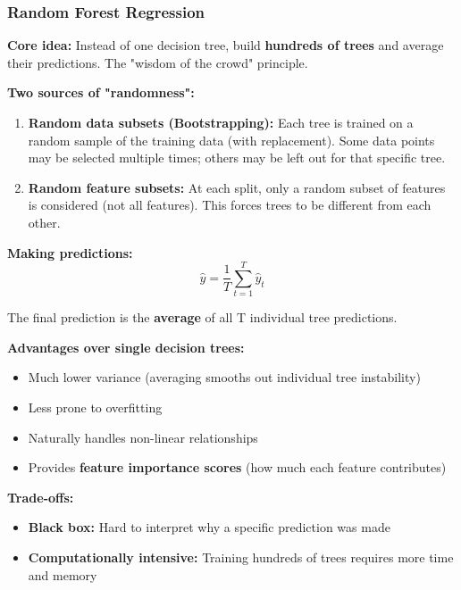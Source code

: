 \documentclass[12pt,openany]{book}
\begin{document}
\medskip


\subsubsection{Random Forest Regression}


\textbf{Core idea:} Instead of one decision tree, build \textbf{hundreds of trees} and average their predictions. The "wisdom of the crowd" principle.

\textbf{Two sources of "randomness":}

\begin{enumerate}[leftmargin=*]
    \item \textbf{Random data subsets (Bootstrapping):} Each tree is trained on a random sample of the training data (with replacement). Some data points may be selected multiple times; others may be left out for that specific tree.

    \item \textbf{Random feature subsets:} At each split, only a random subset of features is considered (not all features). This forces trees to be different from each other.

\end{enumerate}

\textbf{Making predictions:}
\[
\hat{y} = \frac{1}{T}\sum_{t=1}^{T}\hat{y}_t
\]


The final prediction is the \textbf{average} of all T individual tree predictions.

\textbf{Advantages over single decision trees:}
\begin{itemize}[leftmargin=*]
    \item Much lower variance (averaging smooths out individual tree instability)
    \item Less prone to overfitting
    \item Naturally handles non-linear relationships
    \item Provides \textbf{feature importance scores} (how much each feature contributes)

\end{itemize}

\textbf{Trade-offs:}
\begin{itemize}[leftmargin=*]
    \item \textbf{Black box:} Hard to interpret why a specific prediction was made
    \item \textbf{Computationally intensive:} Training hundreds of trees requires more time and memory

\end{itemize}
\end{document}
